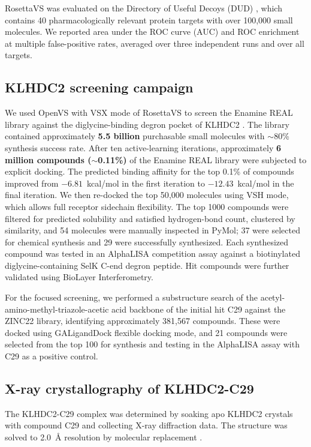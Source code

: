 \documentclass[11pt]{article}
\begin{document}
RosettaVS was evaluated on the Directory of Useful Decoys (DUD) \citep{huang2006dud}, which contains 40 pharmacologically relevant protein targets with over 100{,}000 small molecules. We reported area under the ROC curve (AUC) and ROC enrichment at multiple false-positive rates, averaged over three independent runs and over all targets.

\subsection{KLHDC2 screening campaign}
We used OpenVS with VSX mode of RosettaVS to screen the Enamine REAL library against the diglycine-binding degron pocket of KLHDC2 \citep{rusnac2018recognition}. The library contained approximately \textbf{5.5 billion} purchasable small molecules with $\sim$80\% synthesis success rate. After ten active-learning iterations, approximately \textbf{6 million compounds ($\sim$0.11\%)} of the Enamine REAL library were subjected to explicit docking. The predicted binding affinity for the top 0.1\% of compounds improved from $-6.81$~kcal/mol in the first iteration to $-12.43$~kcal/mol in the final iteration. We then re-docked the top 50{,}000 molecules using VSH mode, which allows full receptor sidechain flexibility. The top 1000 compounds were filtered for predicted solubility and satisfied hydrogen-bond count, clustered by similarity, and 54 molecules were manually inspected in PyMol; 37 were selected for chemical synthesis and 29 were successfully synthesized. Each synthesized compound was tested in an AlphaLISA competition assay against a biotinylated diglycine-containing SelK C-end degron peptide. Hit compounds were further validated using BioLayer Interferometry.

For the focused screening, we performed a substructure search of the acetyl-amino-methyl-triazole-acetic acid backbone of the initial hit C29 against the ZINC22 library, identifying approximately 381{,}567 compounds. These were docked using GALigandDock flexible docking mode, and 21 compounds were selected from the top 100 for synthesis and testing in the AlphaLISA assay with C29 as a positive control.

\subsection{X-ray crystallography of KLHDC2-C29}
The KLHDC2-C29 complex was determined by soaking apo KLHDC2 crystals with compound C29 and collecting X-ray diffraction data. The structure was solved to 2.0~\AA{} resolution by molecular replacement \citep{pettersen2021ucsf}.
\end{document}
